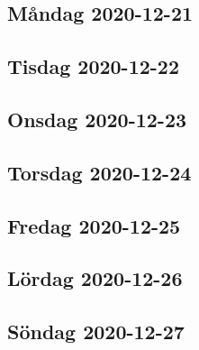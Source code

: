 
\subsection{Måndag 2020-12-21}
\subsection{Tisdag 2020-12-22}
\subsection{Onsdag 2020-12-23}
\subsection{Torsdag 2020-12-24}
\subsection{Fredag 2020-12-25}
\subsection{Lördag 2020-12-26}
\subsection{Söndag 2020-12-27}


